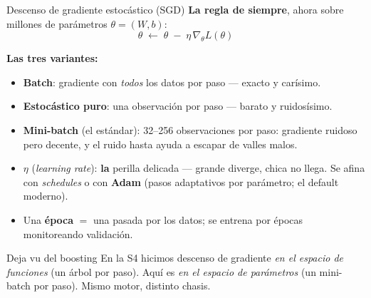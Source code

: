 \documentclass{beamer}
\newcommand{\1}{\mathbb{I}}
\begin{document}
\begin{frame}{Descenso de gradiente estocástico (SGD)}
\small
\textbf{La regla de siempre}, ahora sobre millones de parámetros $\theta = (W, b)$:
\[ \theta \;\leftarrow\; \theta \;-\; \eta \, \nabla_\theta L(\theta) \]
\pause

\textbf{Las tres variantes:}
\begin{itemize}\itemsep4pt
  \item \textbf{Batch}: gradiente con \emph{todos} los datos por paso --- exacto y carísimo.
  \item \textbf{Estocástico puro}: una observación por paso --- barato y ruidosísimo.
  \item \textbf{Mini-batch} (el estándar): 32--256 observaciones por paso: gradiente ruidoso pero decente, y el ruido hasta ayuda a escapar de valles malos.
\end{itemize}
\pause

\begin{itemize}\itemsep4pt
  \item $\eta$ (\emph{learning rate}): \textbf{la} perilla delicada --- grande diverge, chica no llega. Se afina con \emph{schedules} o con \textbf{Adam} (pasos adaptativos por parámetro; el default moderno).
  \item Una \textbf{época} $=$ una pasada por los datos; se entrena por épocas monitoreando validación. \pause
\end{itemize}

\begin{block}{Deja vu del boosting}
En la S4 hicimos descenso de gradiente \emph{en el espacio de funciones} (un árbol por paso). Aquí es \emph{en el espacio de parámetros} (un mini-batch por paso). Mismo motor, distinto chasis.
\end{block}
\end{frame}
\end{document}
